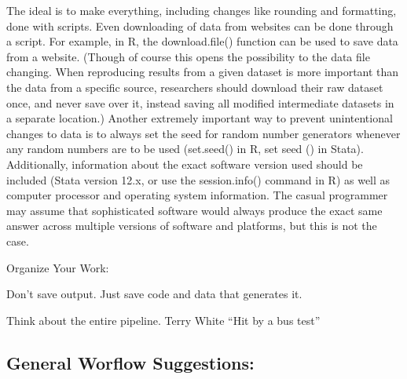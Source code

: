 \documentclass[12pt] {article}
\begin{document}
The ideal is to make everything, including changes like rounding and
formatting, done with scripts. Even downloading of data from websites
can be done through a script. For example, in R, the download.file()
function can be used to save data from a website. (Though of course this
opens the possibility to the data file changing. When reproducing
results from a given dataset is more important than the data from a
specific source, researchers should download their raw dataset once, and
never save over it, instead saving all modified intermediate datasets in
a separate location.) Another extremely important way to prevent
unintentional changes to data is to always set the seed for random
number generators whenever any random numbers are to be used (set.seed()
in R, set seed () in Stata). Additionally, information about the exact
software version used should be included (Stata version 12.x, or use the
session.info() command in R) as well as computer processor and operating
system information. The casual programmer may assume that sophisticated
software would always produce the exact same answer across multiple
versions of software and platforms, but this is not the case.

Organize Your Work:

Don't save output. Just save code and data that generates it.

Think about the entire pipeline. Terry White ``Hit by a bus test''

\subsection{General Worflow
Suggestions:}\label{general-worflow-suggestions}
\end{document}
